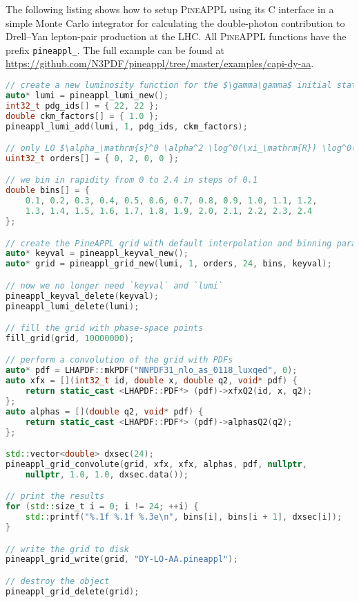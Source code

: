 The following listing shows how to setup \textsc{PineAPPL} using its C interface in a simple Monte Carlo integrator for calculating the double-photon contribution to Drell--Yan lepton-pair production at the LHC.
All \textsc{PineAPPL} functions have the prefix \texttt{pineappl\_}.
The full example can be found at \url{https://github.com/N3PDF/pineappl/tree/master/examples/capi-dy-aa}.

\begin{lstlisting}[language=C++,mathescape=true]
// create a new luminosity function for the $\gamma\gamma$ initial state
auto* lumi = pineappl_lumi_new();
int32_t pdg_ids[] = { 22, 22 };
double ckm_factors[] = { 1.0 };
pineappl_lumi_add(lumi, 1, pdg_ids, ckm_factors);

// only LO $\alpha_\mathrm{s}^0 \alpha^2 \log^0(\xi_\mathrm{R}) \log^0(\xi_\mathrm{F})$
uint32_t orders[] = { 0, 2, 0, 0 };

// we bin in rapidity from 0 to 2.4 in steps of 0.1
double bins[] = {
    0.1, 0.2, 0.3, 0.4, 0.5, 0.6, 0.7, 0.8, 0.9, 1.0, 1.1, 1.2,
    1.3, 1.4, 1.5, 1.6, 1.7, 1.8, 1.9, 2.0, 2.1, 2.2, 2.3, 2.4
};

// create the PineAPPL grid with default interpolation and binning parameters
auto* keyval = pineappl_keyval_new();
auto* grid = pineappl_grid_new(lumi, 1, orders, 24, bins, keyval);

// now we no longer need `keyval` and `lumi`
pineappl_keyval_delete(keyval);
pineappl_lumi_delete(lumi);

// fill the grid with phase-space points
fill_grid(grid, 10000000);

// perform a convolution of the grid with PDFs
auto* pdf = LHAPDF::mkPDF("NNPDF31_nlo_as_0118_luxqed", 0);
auto xfx = [](int32_t id, double x, double q2, void* pdf) {
    return static_cast <LHAPDF::PDF*> (pdf)->xfxQ2(id, x, q2);
};
auto alphas = [](double q2, void* pdf) {
    return static_cast <LHAPDF::PDF*> (pdf)->alphasQ2(q2);
};

std::vector<double> dxsec(24);
pineappl_grid_convolute(grid, xfx, xfx, alphas, pdf, nullptr,
    nullptr, 1.0, 1.0, dxsec.data());

// print the results
for (std::size_t i = 0; i != 24; ++i) {
    std::printf("%.1f %.1f %.3e\n", bins[i], bins[i + 1], dxsec[i]);
}

// write the grid to disk
pineappl_grid_write(grid, "DY-LO-AA.pineappl");

// destroy the object
pineappl_grid_delete(grid);
\end{lstlisting}

